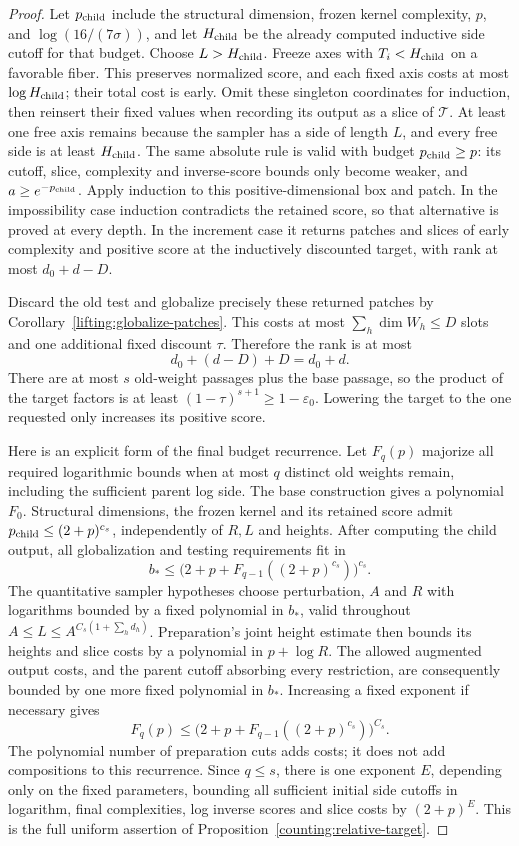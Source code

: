 \begin{proof}
Let $p_{\rm child}$ include the structural dimension, frozen kernel
complexity, $p$, and $\log(16/(7\sigma))$, and let $H_{\rm child}$
be the already computed inductive side cutoff for that budget.
Choose $L>H_{\rm child}$.  Freeze axes with $T_i<H_{\rm child}$
on a favorable fiber.  This preserves normalized score, and each
fixed axis costs at most $\log H_{\rm child}$; their total cost is
early.  Omit these singleton coordinates for induction, then
reinsert their fixed values when recording its output as a slice
of $\mathcal T$.  At least one free axis remains because the
sampler has a side of length $L$, and every free side is at least
$H_{\rm child}$.  The same absolute rule is valid with budget
$p_{\rm child}\ge p$: its cutoff, slice, complexity and inverse-score
bounds only become weaker, and $a\ge e^{-p_{\rm child}}$.
Apply induction to this positive-dimensional box and patch.  In the impossibility
case induction contradicts the retained score, so that alternative
is proved at every depth.  In the increment case it returns patches
and slices of early complexity and positive score at the inductively
discounted target, with rank at most $d_0+d-D$.

Discard the old test and globalize precisely these returned patches
by Corollary~\ref{lifting:globalize-patches}.  This costs at most
$\sum_h\dim W_h\le D$ slots and one additional fixed discount
$\tau$.  Therefore the rank is at most
\[
                  d_0+(d-D)+D=d_0+d.
\]
There are at most $s$ old-weight passages plus the base passage, so
the product of the target factors is at least
$(1-\tau)^{s+1}\ge1-\varepsilon_0$.  Lowering the target to the
one requested only increases its positive score.

Here is an explicit form of the final budget recurrence.  Let
$F_q(p)$ majorize all required logarithmic bounds when at most $q$
distinct old weights remain, including the sufficient parent log
side.  The base construction gives a polynomial $F_0$.  Structural
dimensions, the frozen kernel and its retained score admit
$p_{\rm child}\le(2+p)^{c_s}$, independently of $R,L$ and heights.
After computing the child output, all globalization and testing
requirements fit in
\[
 b_*\le\bigl(2+p+F_{q-1}((2+p)^{c_s})\bigr)^{c_s}.
\]
The quantitative sampler hypotheses choose perturbation, $A$ and
$R$ with logarithms bounded by a fixed polynomial in $b_*$, valid
throughout $A\le L\le A^{C_s(1+\sum_hd_h)}$.  Preparation's joint
height estimate then bounds its heights and slice costs by a
polynomial in $p+\log R$.  The allowed augmented output costs,
and the parent cutoff absorbing every restriction, are consequently
bounded by one more fixed polynomial in $b_*$.  Increasing a fixed
exponent if necessary gives
\[
 F_q(p)\le
 \bigl(2+p+F_{q-1}((2+p)^{c_s})\bigr)^{C_s}.
\]
The polynomial number of preparation cuts adds costs; it does not
add compositions to this recurrence.  Since $q\le s$, there is
one exponent $E$, depending only on the fixed parameters, bounding
all sufficient initial side cutoffs in logarithm, final complexities,
log inverse scores and slice costs by $(2+p)^E$.  This is the full uniform assertion of
Proposition~\ref{counting:relative-target}.
\end{proof}
